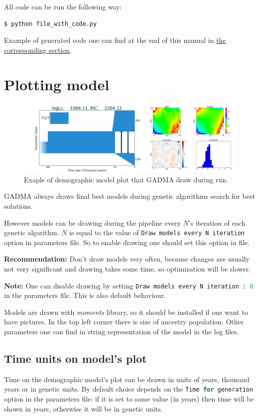 \documentclass[12pt]{article}
\makeatletter
\newcommand{\moments}{\textit{moments}\xspace}
\newcommand{\py}[1]{\lstinline[language=Python, showstringspaces=False]@#1@}
\makeatother
\begin{document}
All code can be run the following way:
\begin{lstlisting}
$ python file_with_code.py
\end{lstlisting}

Example of generated code one can find at the end of this manual in \hyperref[sec:ex-gen-code]{the corresponding section}.

\section{Plotting model}

\begin{figure}[h]
    \centering
    \includegraphics[width=\linewidth]{example_model_plot.png}
    \caption{Exaple of demographic model plot that GADMA draw during run.}
    \label{fig:my_label}
\end{figure}

GADMA always draws final best models during genetic algorithms search for best solutions.

However models can be drawing during the pipeline every $N$'s iteration of each genetic algorithm. $N$ is equal to the value of \py{Draw models every N iteration } option in parameters file. So to enable drawing one should set this option in file.

\textbf{Recommendation: } Don't draw models very often, because changes are usually not very significant and drawing takes some time, so optimization will be slower.

\textbf{Note: } One can disable drawing by setting \py{Draw models every N iteration : 0 } in the parameters file. This is also default behaviour.

Models are drawn with \moments library, so it should be installed if one want to have pictures. In the top left corner there is size of ancestry population. Other parameters one can find in string representation of the model in the log files.

\subsection{Time units on model's plot}
Time on the demographic model's plot can be drawn in units of years,  thousand years or in genetic units. By default choice depends on the \py{Time for generation} option in the parameters file: if it is set to some value (in years) then time will be shown in years, otherwise it will be in genetic units.
\end{document}
